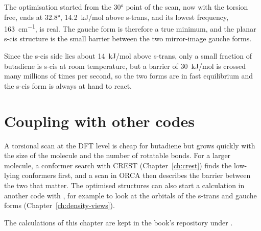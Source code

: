 The optimisation started from the 30° point of the scan, now with the torsion free, ends at 32.8°, \SI{14.2}{kJ/mol} above s-trans, and its lowest frequency, \SI{163}{cm^{-1}}, is real. The gauche form is therefore a true minimum, and the planar s-cis structure is the small barrier between the two mirror-image gauche forms.

Since the s-cis side lies about \SI{14}{kJ/mol} above s-trans, only a small fraction of butadiene is s-cis at room temperature, but a barrier of \SI{30}{kJ/mol} is crossed many millions of times per second, so the two forms are in fast equilibrium and the s-cis form is always at hand to react.

\section{Coupling with other codes}
A torsional scan at the DFT level is cheap for butadiene but grows quickly with the size of the molecule and the number of rotatable bonds. For a larger molecule, a conformer search with CREST (Chapter~\ref{ch:crest}) finds the low-lying conformers first, and a scan in ORCA then describes the barrier between the two that matter. The optimised structures can also start a calculation in another code with , for example to look at the orbitals of the s-trans and gauche forms (Chapter~\ref{ch:density-views}).

The calculations of this chapter are kept in the book's repository under .
